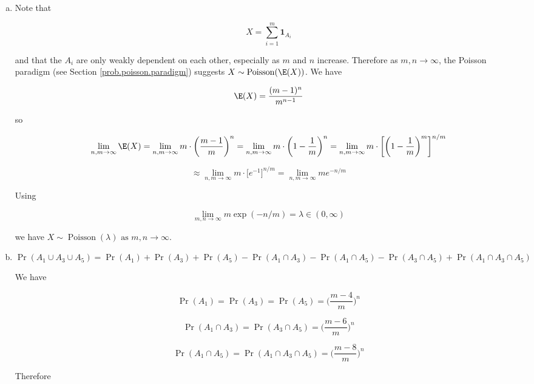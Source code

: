 \begin{enumerate}[(a)]
\item Note that 

\[
X = \sum_{i=1}^m \boldsymbol{1}_{A_i}
\]

and that the \(A_i\) are only weakly dependent on each other, especially as \(m\) and \(n\) increase. Therefore as \(m, n \to \infty\), the Poisson paradigm (see Section \ref{prob.poisson.paradigm}) suggests \(X \sim \operatorname{Poisson}(\E(X))\). We have

\[
\E(X) =  \frac{(m-1)^n}{m^{n-1}}
\]

so

\[
\lim_{n, m \to \infty} \E(X) = \lim_{n, m \to \infty} m \cdot \bigg( \frac{m-1}{m}\bigg)^n = \lim_{n, m \to \infty} m \cdot \bigg( 1 - \frac{1}{m}\bigg)^n = \lim_{n, m \to \infty} m \cdot \bigg[\bigg( 1 - \frac{1}{m}\bigg)^m\bigg]^{n/m}
\]

\[
\approx \lim_{n, m \to \infty} m \cdot \big[e^{-1}\big]^{n/m} = \lim_{n, m \to \infty} m e^{-n/m}
\]



%
%


Using

\[
\lim_{m, n \to \infty} m \exp(-n/m) = \lambda \in (0, \infty)
\]

we have \( \boxed{ X  \sim \operatorname{Poisson}(\lambda) \text{ as } m,n \to \infty }\).

\item


\[
\Pr(A_1 \cup A_3 \cup A_5) = \Pr(A_1) + \Pr(A_3) + \Pr(A_5) - \Pr(A_1 \cap A_3) - \Pr(A_1 \cap A_5) - \Pr( A_3 \cap A_5) + \Pr(A_1 \cap A_3 \cap A_5)
\]

We have

\[
\Pr(A_1) = \Pr(A_3) = \Pr(A_5) = \bigg(  \frac{m-4}{m} \bigg)^n
\]

\[
 \Pr(A_1 \cap A_3) = \Pr( A_3 \cap A_5) =  \bigg(  \frac{m-6}{m} \bigg)^n
\]

\[
\Pr(A_1 \cap A_5) = \Pr(A_1 \cap A_3 \cap A_5) = \bigg(  \frac{m-8}{m} \bigg)^n
\]

Therefore


\end{enumerate}
